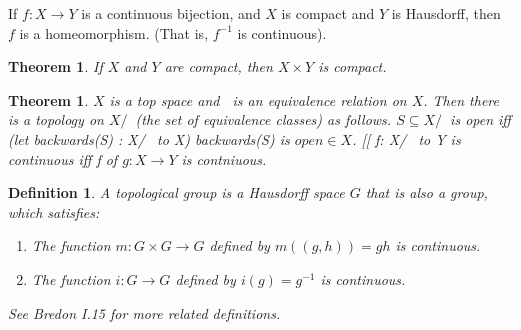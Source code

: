 \documentclass[11pt,leqno,oneside]{amsart}
\theoremstyle{mystyle} \newtheorem{thrm}[thm]{Theorem}
\theoremstyle{mystyle} \newtheorem{defi}[thm]{Definition}
\begin{document}
\begin{cor}
	If $f : X \to Y$ is a continuous bijection, and $X$ is compact and $Y$ is Hausdorff, then $f$ is a homeomorphism. (That is, $f^{-1}$ is continuous).
\end{cor}
\begin{thrm}
	If $X$ and $Y$ are compact, then $X \times Y$ is compact.
\end{thrm}
\begin{thrm}
	$X$ is a top space and $~$ is an equivalence relation on $X$.  Then there is a topology on $X/~$ (the set of equivalence classes) as follows.  $S \subseteq X/~$ is open iff (let backwards(S) : X/~ to X) backwards(S) is $open \in X$.  [[ f: X/~ to Y is continuous iff f of $g: X \to Y$ is contniuous.
\end{thrm}
\begin{defi}
	A \emph{topological group} is a Hausdorff space $G$ that is also a group, which satisfies:
	\begin{enumerate}
		\item The function $m : G \times G \to G$ defined by $m((g,h)) = gh$ is continuous.
		\item The function $i : G \to G$ defined by $i(g) = g^{-1}$ is continuous.
	\end{enumerate}
	See Bredon I.15 for more related definitions.
\end{defi}
\end{document}
